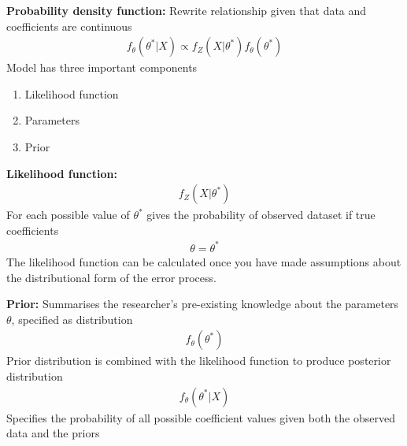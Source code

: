 \documentclass{beamer}
\begin{document}
\begin{frame}
  \textbf{Probability density function:} Rewrite relationship given that data and coefficients are continuous  
  \begin{align}
    f_\theta(\theta^* | X) \propto f_Z(X | \theta^*)f_\theta(\theta^*)
\end{align}
 Model has three important components
 \begin{enumerate}
   \item Likelihood function
   \item Parameters
   \item Prior
 \end{enumerate}  
\end{frame}

\begin{frame}
  \textbf{Likelihood function:} 
  \begin{align}
    f_Z(X | \theta^*)
  \end{align}
    For each possible value of $\theta^*$ gives the probability of observed dataset if true coefficients
    \begin{align}
      \theta= \theta^*
    \end{align}    
    The likelihood function can be calculated once you have made assumptions about the distributional form of the error process.    
\end{frame}

\begin{frame}
  \textbf{Prior:} Summarises the researcher's pre-existing knowledge about the parameters $\theta$, specified as distribution 
  \begin{align}
    f_\theta(\theta^*)
  \end{align}
  Prior distribution is combined with the likelihood function to produce posterior distribution
    \begin{align}
      f_\theta(\theta^* | X)
    \end{align}
    Specifies the probability of all possible coefficient values given both the observed data and the priors    
\end{frame}
\end{document}
